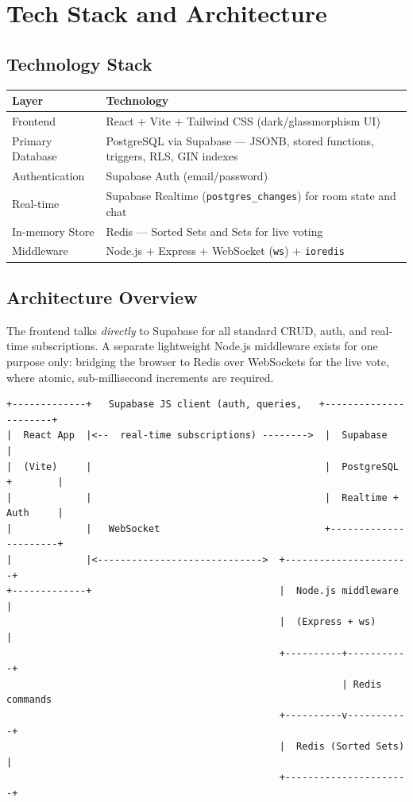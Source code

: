 \documentclass[11pt,a4paper]{article}
\begin{document}
\section{Tech Stack and Architecture}
\subsection{Technology Stack}
\begin{longtable}{p{3.2cm} p{10.5cm}}
\toprule
\textbf{Layer} & \textbf{Technology} \\
\midrule
Frontend        & React + Vite + Tailwind CSS (dark/glassmorphism UI) \\
Primary Database & PostgreSQL via Supabase --- JSONB, stored functions, triggers, RLS, GIN indexes \\
Authentication  & Supabase Auth (email/password) \\
Real-time       & Supabase Realtime (\texttt{postgres\_changes}) for room state and chat \\
In-memory Store & Redis --- Sorted Sets and Sets for live voting \\
Middleware      & Node.js + Express + WebSocket (\texttt{ws}) + \texttt{ioredis} \\
\bottomrule
\end{longtable}

\subsection{Architecture Overview}
The frontend talks \emph{directly} to Supabase for all standard CRUD, auth, and
real-time subscriptions. A separate lightweight Node.js middleware exists for one
purpose only: bridging the browser to Redis over WebSockets for the live vote,
where atomic, sub-millisecond increments are required.

\begin{lstlisting}[basicstyle=\ttfamily\scriptsize]
+-------------+   Supabase JS client (auth, queries,   +----------------------+
|  React App  |<--  real-time subscriptions) -------->  |  Supabase            |
|  (Vite)     |                                         |  PostgreSQL +        |
|             |                                         |  Realtime + Auth     |
|             |   WebSocket                             +----------------------+
|             |<----------------------------->  +----------------------+
+-------------+                                 |  Node.js middleware   |
                                                |  (Express + ws)       |
                                                +----------+-----------+
                                                           | Redis commands
                                                +----------v-----------+
                                                |  Redis (Sorted Sets) |
                                                +----------------------+
\end{lstlisting}
\end{document}
